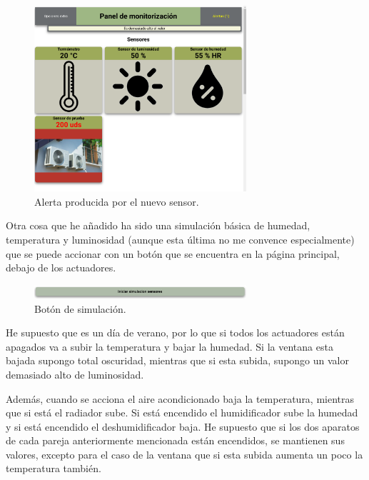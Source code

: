 \documentclass{article}
\begin{document}
\begin{figure}[H]
    \centering
    \includegraphics[width=0.7\textwidth]{images/nuevosensoralerta.png}
    \caption{Alerta producida por el nuevo sensor.}
\end{figure}

Otra cosa que he añadido ha sido una simulación básica de humedad, temperatura y luminosidad (aunque esta última no me convence especialmente) que se puede accionar con un botón que se encuentra en la página principal, debajo de los actuadores. 

\begin{figure}[H]
    \centering
    \includegraphics[width=0.7\textwidth]{images/iniciarsim.png}
    \caption{Botón de simulación.}
\end{figure}


He supuesto que es un día de verano, por lo que si todos los actuadores están apagados va a subir la temperatura y bajar la humedad. Si la ventana esta bajada supongo total oscuridad, mientras que si esta subida, supongo un valor demasiado alto de luminosidad.

\bigskip

Además, cuando se acciona el aire acondicionado baja la temperatura, mientras que si está el radiador sube. Si está encendido el humidificador sube la humedad y si está encendido el deshumidificador baja. He supuesto que si los dos aparatos de cada pareja anteriormente mencionada están encendidos, se mantienen sus valores, excepto para el caso de la ventana que si esta subida aumenta un poco la temperatura también.
\end{document}

